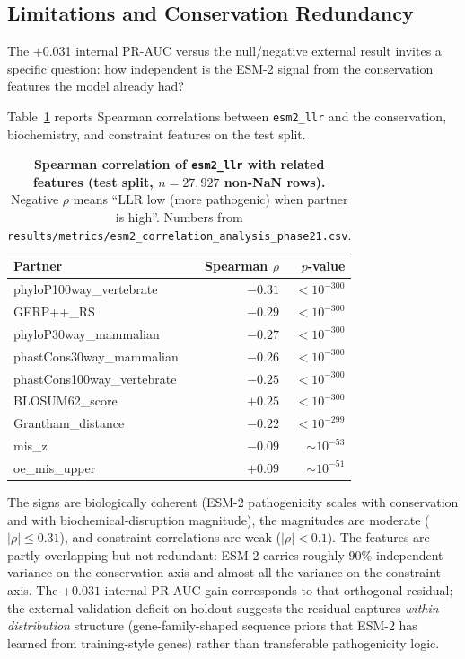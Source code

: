 \documentclass[11pt,a4paper,oneside]{report}
\begin{document}
\subsection{Limitations and Conservation Redundancy}
\label{sec:phase21-limits}

The +0.031 internal PR-AUC versus the null/negative external
result invites a specific question: how independent is the ESM-2
signal from the conservation features the model already had?

Table~\ref{tab:phase21-correlations} reports Spearman correlations
between \texttt{esm2\_llr} and the conservation, biochemistry, and
constraint features on the test split.

\begin{table}[H]
\centering
\caption[ESM-2 vs partner-feature correlations]{\textbf{Spearman
correlation of \texttt{esm2\_llr} with related features
(test split, $n=27{,}927$ non-NaN rows).} Negative $\rho$ means
``LLR low (more pathogenic) when partner is high''. Numbers from
\texttt{results/metrics/esm2\_correlation\_analysis\_phase21.csv}.}
\label{tab:phase21-correlations}
\small
\begin{tabular}{@{} l r r @{}}
\toprule
\textbf{Partner} & \textbf{Spearman $\rho$} & \textbf{$p$-value} \\
\midrule
phyloP100way\_vertebrate     & $-0.31$ & $<10^{-300}$ \\
GERP++\_RS                   & $-0.29$ & $<10^{-300}$ \\
phyloP30way\_mammalian       & $-0.27$ & $<10^{-300}$ \\
phastCons30way\_mammalian    & $-0.26$ & $<10^{-300}$ \\
phastCons100way\_vertebrate  & $-0.25$ & $<10^{-300}$ \\
BLOSUM62\_score              & $+0.25$ & $<10^{-300}$ \\
Grantham\_distance           & $-0.22$ & $<10^{-299}$ \\
mis\_z                       & $-0.09$ & $\sim 10^{-53}$ \\
oe\_mis\_upper               & $+0.09$ & $\sim 10^{-51}$ \\
\bottomrule
\end{tabular}
\end{table}

The signs are biologically coherent (ESM-2 pathogenicity scales
with conservation and with biochemical-disruption magnitude),
the magnitudes are moderate ($|\rho|\le 0.31$), and constraint
correlations are weak ($|\rho|<0.1$). The features are partly
overlapping but not redundant: ESM-2 carries roughly $90\%$
independent variance on the conservation axis and almost all the
variance on the constraint axis. The +$0.031$ internal PR-AUC
gain corresponds to that orthogonal residual; the
external-validation deficit on holdout suggests the residual
captures \emph{within-distribution} structure (gene-family-shaped
sequence priors that ESM-2 has learned from training-style genes)
rather than transferable pathogenicity logic.
\end{document}
